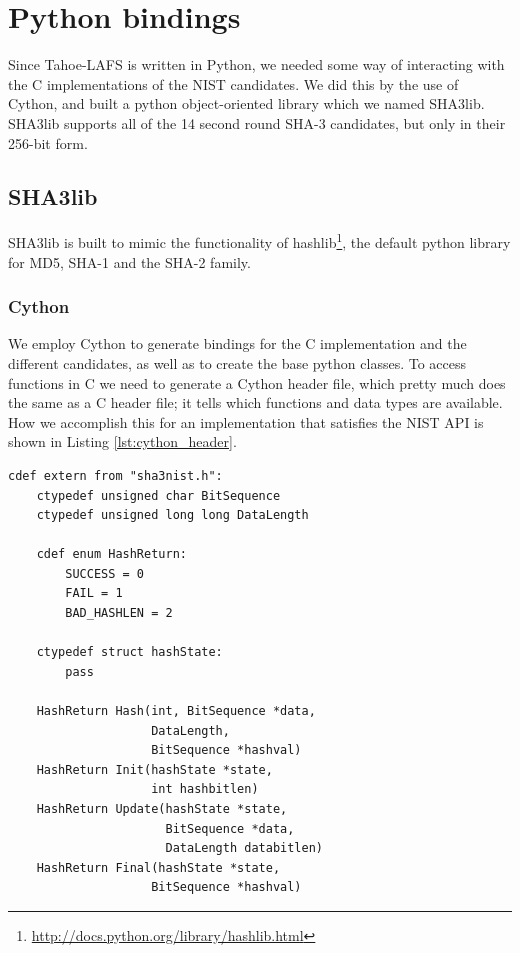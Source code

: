 \documentclass[english,12pt,a4paper]{book}
\begin{document}


\section{Python bindings}

Since Tahoe-\ac{LAFS} is written in Python, we needed some way of interacting
with the C implementations of the NIST candidates. We did this by the use of
Cython, and built a python object-oriented library which we named SHA3lib.
SHA3lib supports all of the 14 second round \ac{SHA}-3 candidates, but only in
their 256-bit form.

\subsection{SHA3lib}
SHA3lib is built to mimic the functionality of
hashlib\footnote{\url{http://docs.python.org/library/hashlib.html}}, the
default python library for MD5, \ac{SHA}-1 and the \ac{SHA}-2 family. 

\subsubsection{Cython}
We employ Cython to generate bindings for the C implementation and the
different candidates, as well as to create the base python classes. To access
functions in C we need to generate a Cython header file, which pretty much does
the same as a C header file; it tells which functions and data types are
available. How we accomplish this for an implementation that satisfies the
\ac{NIST} \ac{API} is shown in Listing \ref{lst:cython_header}. 

\begin{lstlisting}[label=lst:cython_header, caption=Cython header\, echo\_hash\_h.pxd]
cdef extern from "sha3nist.h":
    ctypedef unsigned char BitSequence
    ctypedef unsigned long long DataLength

    cdef enum HashReturn:
        SUCCESS = 0
        FAIL = 1
        BAD_HASHLEN = 2

    ctypedef struct hashState:
        pass

    HashReturn Hash(int, BitSequence *data, 
                    DataLength, 
                    BitSequence *hashval)
    HashReturn Init(hashState *state, 
                    int hashbitlen)
    HashReturn Update(hashState *state, 
                      BitSequence *data, 
                      DataLength databitlen)
    HashReturn Final(hashState *state, 
                    BitSequence *hashval)
\end{lstlisting}
\end{document}
